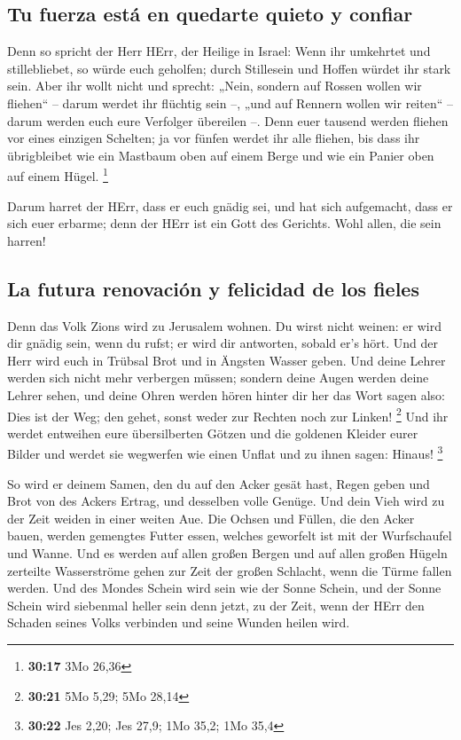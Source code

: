 \hypertarget{tu-fuerza-estuxe1-en-quedarte-quieto-y-confiar}{%
\subsection{Tu fuerza está en quedarte quieto y
confiar}\label{tu-fuerza-estuxe1-en-quedarte-quieto-y-confiar}}

 Denn so spricht der Herr HErr, der Heilige in Israel:
Wenn ihr umkehrtet und stillebliebet, so würde euch geholfen; durch
Stillesein und Hoffen würdet ihr stark sein. Aber ihr wollt nicht
 und sprecht: „Nein, sondern auf Rossen wollen wir
fliehen`` -- darum werdet ihr flüchtig sein --, „und auf Rennern wollen
wir reiten`` -- darum werden euch eure Verfolger übereilen --.
 Denn euer tausend werden fliehen vor eines einzigen
Schelten; ja vor fünfen werdet ihr alle fliehen, bis dass ihr
übrigbleibet wie ein Mastbaum oben auf einem Berge und wie ein Panier
oben auf einem Hügel. \footnote{\textbf{30:17} 3Mo 26,36}

 Darum harret der HErr, dass er euch gnädig sei, und hat
sich aufgemacht, dass er sich euer erbarme; denn der HErr ist ein Gott
des Gerichts. Wohl allen, die sein harren!

\hypertarget{la-futura-renovaciuxf3n-y-felicidad-de-los-fieles}{%
\subsection{La futura renovación y felicidad de los
fieles}\label{la-futura-renovaciuxf3n-y-felicidad-de-los-fieles}}

 Denn das Volk Zions wird zu Jerusalem wohnen. Du wirst
nicht weinen: er wird dir gnädig sein, wenn du rufst; er wird dir
antworten, sobald er's hört.  Und der Herr wird euch in
Trübsal Brot und in Ängsten Wasser geben. Und deine Lehrer werden sich
nicht mehr verbergen müssen; sondern deine Augen werden deine Lehrer
sehen,  und deine Ohren werden hören hinter dir her das
Wort sagen also: Dies ist der Weg; den gehet, sonst weder zur Rechten
noch zur Linken! \footnote{\textbf{30:21} 5Mo 5,29; 5Mo 28,14}
 Und ihr werdet entweihen eure übersilberten Götzen und
die goldenen Kleider eurer Bilder und werdet sie wegwerfen wie einen
Unflat und zu ihnen sagen: Hinaus! \footnote{\textbf{30:22} Jes 2,20;
  Jes 27,9; 1Mo 35,2; 1Mo 35,4}

 So wird er deinem Samen, den du auf den Acker gesät
hast, Regen geben und Brot von des Ackers Ertrag, und desselben volle
Genüge. Und dein Vieh wird zu der Zeit weiden in einer weiten Aue.
 Die Ochsen und Füllen, die den Acker bauen, werden
gemengtes Futter essen, welches geworfelt ist mit der Wurfschaufel und
Wanne.  Und es werden auf allen großen Bergen und auf
allen großen Hügeln zerteilte Wasserströme gehen zur Zeit der großen
Schlacht, wenn die Türme fallen werden.  Und des Mondes
Schein wird sein wie der Sonne Schein, und der Sonne Schein wird
siebenmal heller sein denn jetzt, zu der Zeit, wenn der HErr den Schaden
seines Volks verbinden und seine Wunden heilen wird.

